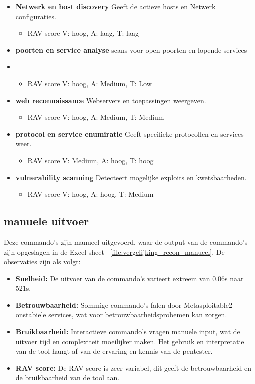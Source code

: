 \begin{itemize}
  \item \textbf{Netwerk en host discovery} Geeft de actieve hosts en Netwerk configuraties.
    {\scriptsize \begin{itemize}
      \item \textmd{RAV score} V: hoog, A: laag, T: laag
    \end{itemize} }
  \item \textbf{poorten en service analyse} scans voor open poorten en lopende services
    \item {\scriptsize \begin{itemize}
      \item \textmd{RAV score} V: hoog, A: Medium, T: Low
    \end{itemize} }
  \item \textbf{web reconnaissance} Webservers en toepassingen weergeven. 
    {\scriptsize \begin{itemize}
      \item \textmd{RAV score} V: hoog, A: Medium, T: Medium
    \end{itemize} }
  \item \textbf{protocol en service enumiratie} Geeft specifieke protocollen en services weer.
  {\scriptsize \begin{itemize}
    \item \textmd{RAV score} V: Medium, A: hoog, T: hoog
  \end{itemize} }
  \item \textbf{vulnerability scanning} Detecteert mogelijke exploits en kwetsbaarheden.
  {\scriptsize \begin{itemize}
    \item \textmd{RAV score} V: hoog, A: hoog, T: Medium
  \end{itemize} }
\end{itemize}
  
\subsection{manuele uitvoer}
Deze commando's zijn manueel uitgevoerd, waar de output van de commando's zijn opgeslagen in de Excel sheet ~\ref{file:vergelijking_recon_manueel}.
De observaties zijn als volgt:

\begin{itemize}
  \item \textbf{Snelheid:} De uitvoer van de commando's varieert extreem van 0.06s naar 521s.
  \item \textbf{Betrouwbaarheid:} Sommige commando's falen door Metasploitable2 onstabiele services, wat voor betrouwbaarheidsprobemen kan zorgen.
  \item \textbf{Bruikbaarheid:} Interactieve commando's vragen manuele input, wat de uitvoer tijd en complexiteit moeilijker maken. Het gebruik en interpretatie van de tool hangt af van de ervaring en kennis van de pentester.
  \item \textbf{RAV score:} De RAV score is zeer variabel, dit geeft de betrouwbaarheid en de bruikbaarheid van de tool aan.

\end{itemize}


